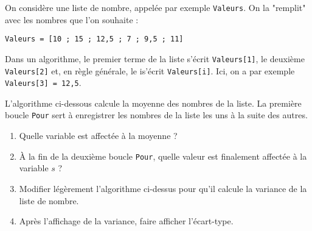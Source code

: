 \documentclass[10pt,openright,twoside,french]{book}
\begin{document}

On considère une liste de nombre, appelée par exemple \texttt{Valeurs}. On la "remplit" avec les nombres que l'on souhaite :
\begin{center}
    \texttt{Valeurs = [10 ; 15 ; 12,5 ; 7 ; 9,5 ; 11]}
\end{center}
Dans un algorithme, le premier terme de la liste s'écrit \texttt{Valeurs[1]}, le deuxième \texttt{Valeurs[2]} et, en règle générale, le i\ieme s'écrit \texttt{Valeurs[i]}. Ici, on a par exemple \texttt{Valeurs[3] = 12,5}.\medskip

L'algorithme ci-dessous calcule la moyenne des nombres de la liste. La première boucle \texttt{Pour} sert à enregistrer les nombres de la liste les uns à la suite des autres.

\begin{center}
\small
\end{center}

\begin{enumerate}
    \item Quelle variable est affectée à la moyenne ?
    \item À la fin de la deuxième boucle \texttt{Pour}, quelle valeur est finalement affectée à la variable $s$ ?
    \item Modifier légèrement l'algorithme ci-dessus pour qu'il calcule la variance de la liste de nombre.
    \item Après l'affichage de la variance, faire afficher l'écart-type.
\end{enumerate}
\end{document}

